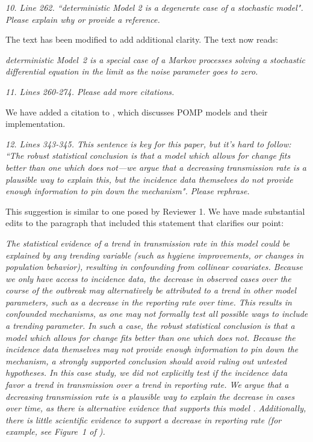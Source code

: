 \documentclass[11pt]{article}
\newcommand\report[1]{{\color{mygreen} \vspace{1mm}\hspace{0.25in}\parbox{6in}{\em #1}}}
\newcommand\article[1]{{\color{blue} \vspace{1mm}\hspace{0.25in}\parbox{6in}{\em #1}}}
\begin{document}
\report{
  10. Line 262. ``deterministic Model 2 is a degenerate case of a stochastic model". Please explain why or provide a reference.
}

The text has been modified to add additional clarity. The text now reads: 

\article{deterministic Model~2 is a special case of a Markov processes solving a stochastic differential equation in the limit as the noise parameter goes to zero.}

\report{
  11. Lines 260-274. Please add more citations.
}

We have added a citation to \cite{king16}, which discusses POMP models and their implementation. 

\report{
  12. Lines 343-345. This sentence is key for this paper, but it’s hard to follow: ``The robust statistical conclusion is that a model which allows for change fits better than one which does not—we argue that a decreasing transmission rate is a plausible way to explain this, but the incidence data themselves do not provide enough information to pin down the mechanism". Please rephrase.
}

This suggestion is similar to one posed by Reviewer 1. We have made substantial edits to the paragraph that included this statement that clarifies our point:

\article{The statistical evidence of a trend in transmission rate in this model could be explained by any trending variable (such as hygiene improvements, or changes in population behavior), resulting in confounding from collinear covariates. Because we only have access to incidence data, the decrease in observed cases over the course of the outbreak may alternatively be attributed to a trend in other model parameters, such as a decrease in the reporting rate over time.
This results in confounded mechanisms, as one may not formally test all possible ways to include a trending parameter. In such a case, the robust statistical conclusion is that a model which allows for change fits better than one which does not. Because the incidence data themselves may not provide enough information to pin down the mechanism, a strongly supported conclusion should avoid ruling out untested hypotheses. In this case study, we did not explicitly test if the incidence data favor a trend in transmission over a trend in reporting rate. We argue that a decreasing transmission rate is a plausible way to explain the decrease in cases over time, as there is alternative evidence that supports this model \cite{rebaudet19CATI,rebaudet21,michel19}. Additionally, there is little scientific evidence to support a decrease in reporting rate (for example, see Figure~1 of \cite{rebaudet21}).}
\end{document}
